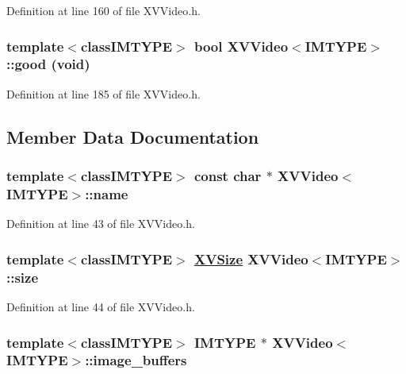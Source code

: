 Definition at line 160 of file XVVideo.h.\label{XVVideo_a15}
\hypertarget{class_XVVideo_a15}{
\subsubsection[good]{\setlength{\rightskip}{0pt plus 5cm}template$<$classIMTYPE$>$ bool XVVideo$<$IMTYPE$>$::good (void)}}




Definition at line 185 of file XVVideo.h.

\subsection{Member Data Documentation}
\label{XVVideo_n0}
\hypertarget{class_XVVideo_n0}{
\subsubsection[name]{\setlength{\rightskip}{0pt plus 5cm}template$<$classIMTYPE$>$ const char $\ast$ XVVideo$<$IMTYPE$>$::name}}




Definition at line 43 of file XVVideo.h.\label{XVVideo_n1}
\hypertarget{class_XVVideo_n1}{
\subsubsection[size]{\setlength{\rightskip}{0pt plus 5cm}template$<$classIMTYPE$>$ \hyperlink{class_XVSize}{XVSize} XVVideo$<$IMTYPE$>$::size}}




Definition at line 44 of file XVVideo.h.\label{XVVideo_n2}
\hypertarget{class_XVVideo_n2}{
\subsubsection[image_buffers]{\setlength{\rightskip}{0pt plus 5cm}template$<$classIMTYPE$>$ IMTYPE $\ast$ XVVideo$<$IMTYPE$>$::image\_\-buffers}}




